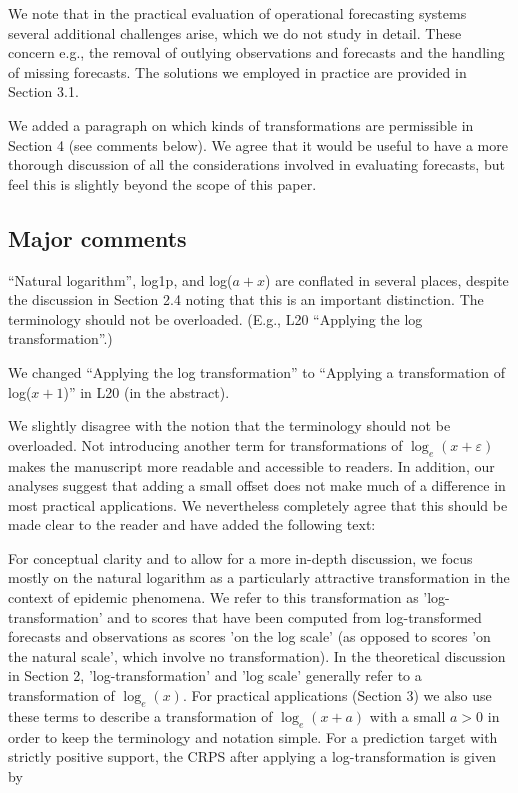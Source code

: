 \documentclass{article}
\newcommand{\black}{\color{black}}
\newcommand{\blue}{\color{blue}}
\newcommand{\indented}{\setlength{\leftskip}{1cm}}
\newcommand{\notindented}{\setlength{\leftskip}{0cm}}
\begin{document}
\indented
We note that in the practical evaluation of operational forecasting systems  several additional challenges arise, which we do not study in detail. These concern e.g., the removal of outlying observations and forecasts and the handling of missing forecasts. The solutions we employed in practice are provided in Section 3.1.

\notindented

We added a paragraph on which kinds of transformations are permissible in Section 4 (see comments below). We agree that it would be useful to have a more thorough discussion of all the considerations involved in evaluating forecasts, but feel this is slightly beyond the scope of this paper. 

\blue
\subsection{Major comments}

``Natural logarithm'', log1p, and log($a + x$) are conflated in several places, despite the discussion in Section 2.4 noting that this is an important distinction. The terminology should not be overloaded. (E.g., L20 ``Applying the log transformation''.)

\black
We changed ``Applying the log transformation'' to ``Applying a transformation of log($x + 1$)'' in L20 (in the abstract). 

We slightly disagree with the notion that the terminology should not be overloaded. Not introducing another term for transformations of $\log_{e}(x + \varepsilon)$ makes the manuscript more readable and accessible to readers. In addition, our analyses suggest that adding a small offset does not make much of a difference in most practical applications. We nevertheless completely agree that this should be made clear to the reader and have added the following text: 

\indented
For conceptual clarity and to allow for a more in-depth discussion, we focus mostly on the natural logarithm as a particularly attractive transformation in the context of epidemic phenomena. We refer to this transformation as 'log-transformation' and to scores that have been computed from log-transformed forecasts and observations as scores 'on the log scale' (as opposed to scores 'on the natural scale', which involve no transformation). In the theoretical discussion in Section 2, 'log-transformation' and 'log scale' generally refer to a transformation of $\log_{e}(x)$. For practical applications (Section 3) we also use these terms to describe a transformation of $\log_{e}(x + a)$ with a small $a > 0$ in order to keep the terminology and notation simple. For a prediction target with strictly positive support, the CRPS after applying a log-transformation is given by
\end{document}
